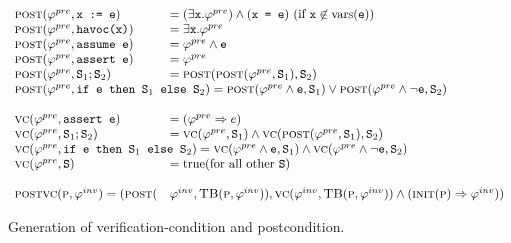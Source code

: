 
\begin{figure}
\[
\begin{array}{ll}
\postfn(\pre, \code{x := e}) &= (\exists \code{x}. \pre) \wedge (\code{x =
  e}) \ (\text{if } \code{x} \not\in \text{vars}(\code{e})) \\
\postfn(\pre, \code{havoc(x)}) &= \exists \code{x}. \pre \\
\postfn(\pre, \code{assume e}) &= \pre \wedge \code{e} \\
\postfn(\pre, \code{assert e}) &= \pre \\
\postfn(\pre, \stmtSA ; \stmtSB) &= \postfn( \postfn(\pre, \stmtSA), \stmtSB) \\
\multicolumn{2}{l}{\postfn(\pre, \code{if \expr{} then \stmtSA{} else \stmtSB{}}) = \postfn(\pre \wedge \expr, \stmtSA) \vee \postfn(\pre \wedge \neg \expr, \stmtSB)} \\
\\
\vcfn(\pre, \code{assert e}) &= (\pre \Rightarrow e) \\
\vcfn(\pre, \stmtSA ; \stmtSB) &= \vcfn(\pre, \stmtSA) \wedge \vcfn( \postfn(\pre, \stmtSA), \stmtSB) \\
\multicolumn{2}{l}{
\vcfn(\pre, \code{if \expr{} then \stmtSA{} else \stmtSB{}}) = \vcfn(\pre \wedge \expr, \stmtSA) \wedge \vcfn(\pre \wedge \neg \expr, \stmtSB)
} \\
\vcfn(\pre, \stmt) &= \text{true} (\text{for all other \stmt}) \\
\\
\mainvc{\procP}{\inv} = (\postfn(&\inv, \tbody(\proc,\inv)), \vcfn(\inv,
\tbody(\proc,\inv)) \wedge (\initstatefn(\proc) \Rightarrow \inv))
\end{array}
\]
\caption{Generation of verification-condition and postcondition.}
\label{fig:vcgen}
\end{figure}

